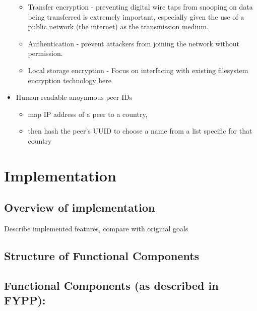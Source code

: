 \documentclass[12pt,a4paper,]{adreport}
\begin{document}
\begin{itemize}
  \begin{itemize}
  \itemsep1pt\parskip0pt
  \item
    Transfer encryption - preventing digital wire taps from snooping on
    data being transferred is extremely important, especially given the
    use of a public network (the internet) as the transmission medium.
  \item
    Authentication - prevent attackers from joining the network without
    permission.
  \item
    Local storage encryption - Focus on interfacing with existing
    filesystem encryption technology here
  \end{itemize}
\item
  Human-readable anoynmous peer IDs

  \begin{itemize}
  \itemsep1pt\parskip0pt
  \item
    map IP address of a peer to a country,
  \item
    then hash the peer's UUID to choose a name from a list specific for
    that country
  \end{itemize}
\end{itemize}

\chapter{Implementation}\label{implementation}

\section{Overview of implementation}\label{overview-of-implementation}

Describe implemented features, compare with original goals

\section{Structure of Functional
Components}\label{structure-of-functional-components}

\section{Functional Components (as described in
FYPP):}\label{functional-components-as-described-in-fypp}
\end{document}
